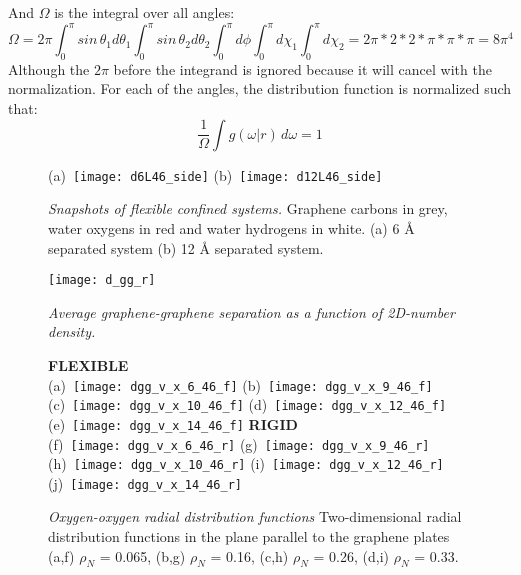 \documentclass[12pt]{article}
\begin{document}
And \(\Omega\) is the integral over all angles:
\begin{equation}
    \Omega = 2\pi \int_0^\pi sin \, \theta_1 d \theta_1 \int_0^\pi sin \, \theta_2 d \theta_2 \int_0^\pi d\phi\int_0^\pi d\chi_1 \int_0^\pi d\chi_2 = 2 \pi * 2 * 2 * \pi * \pi * \pi = 8 \pi^4
\end{equation}
Although the \(2\pi\) before the integrand is ignored because it will cancel with the normalization. For each of the angles, the distribution function is normalized such that:
\begin{equation}
    \frac{1}{\Omega} \int g(\omega | r ) \, d \omega = 1  
\end{equation}

\begin{figure}[h!]
	\centering
	(a)~\texttt{[image: d6L46\_side]} 
	(b)~\texttt{[image: d12L46\_side]}
	\caption{\textit{Snapshots of flexible confined systems.} Graphene carbons in grey, water oxygens in red and water hydrogens in white. (a) 6 \r A separated system (b) 12 \r A separated system. }
	\label{fig:snapshot}
\end{figure}

\begin{figure}[h!]
	\centering
	\texttt{[image: d\_gg\_r]} 
	\caption{\textit{Average graphene-graphene separation as a function of 2D-number density.}}
	\label{fig:dgg}
\end{figure}

\begin{figure}[h!]
	\centering
	\textbf{FLEXIBLE} \\
	(a)~\texttt{[image: dgg\_v\_x\_6\_46\_f]} 
	(b)~\texttt{[image: dgg\_v\_x\_9\_46\_f]}
	(c)~\texttt{[image: dgg\_v\_x\_10\_46\_f]}
	(d)~\texttt{[image: dgg\_v\_x\_12\_46\_f]}
	(e)~\texttt{[image: dgg\_v\_x\_14\_46\_f]}
	\textbf{RIGID} \\
	(f)~\texttt{[image: dgg\_v\_x\_6\_46\_r]} 
	(g)~\texttt{[image: dgg\_v\_x\_9\_46\_r]}
	(h)~\texttt{[image: dgg\_v\_x\_10\_46\_r]}
	(i)~\texttt{[image: dgg\_v\_x\_12\_46\_r]}
	(j)~\texttt{[image: dgg\_v\_x\_14\_46\_r]}
	\caption{\textit{Oxygen-oxygen radial distribution functions} Two-dimensional radial distribution functions in the plane parallel to the graphene plates (a,f) \(\rho_N\) = 0.065, (b,g) \(\rho_N\) = 0.16, (c,h) \(\rho_N\) = 0.26, (d,i) \(\rho_N\) = 0.33.}
	\label{fig:density_vs_dgg}
\end{figure}
\end{document}
